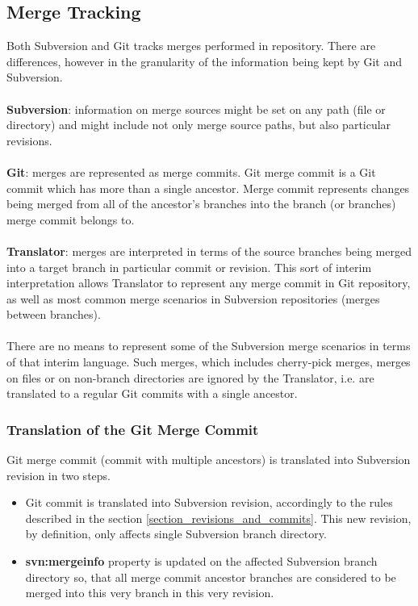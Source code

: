 \renewcommand{\figurename}{Diagram}
\subsection{Merge Tracking}

Both Subversion and Git tracks merges performed in repository. There are differences, however in 
the granularity of the information being kept by Git and Subversion.
\\\\
\textbf{Subversion}: information on merge sources might be set on any path (file or directory) and might include not only
merge source paths, but also particular revisions.
\\\\
\textbf{Git}: merges are represented as merge commits. Git merge commit is a Git commit which has more than a single 
ancestor. Merge commit represents changes being merged from all of the ancestor's branches into the branch (or branches)
merge commit belongs to.
\\\\
\textbf{Translator}: merges are interpreted in terms of the source branches being merged into a 
target branch in particular commit or revision. This sort of interim interpretation allows Translator
to represent any merge commit in Git repository, as well as most common merge scenarios in Subversion repositories (merges
between branches).
\\\\
There are no means to represent some of the Subversion merge scenarios in terms of that interim language.
Such merges, which includes cherry-pick merges, merges on files or on non-branch directories are ignored by the Translator,
i.e. are translated to a regular Git commits with a single ancestor.

\subsubsection{Translation of the Git Merge Commit}

Git merge commit (commit with multiple ancestors) is translated into Subversion revision in two steps.
\begin{itemize}
\item Git commit is translated into Subversion revision, accordingly to the rules described in the section \ref{section_revisions_and_commits}.
This new revision, by definition, only affects single Subversion branch directory.
\item \textbf{svn:mergeinfo} property is updated on the affected Subversion branch directory so, that all merge
commit ancestor branches are considered to be merged into this very branch in this very revision.
\end{itemize}


